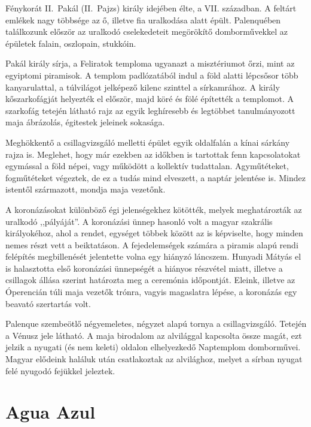 Fénykorát II.~Pakál (II.~Pajzs) király idejében élte, a VII. században.
A feltárt emlékek nagy többsége az ő, illetve fia uralkodása alatt
épült. Palenquében találkozunk először az uralkodó cselekedeteit
megörökítő domborművekkel az épületek falain, oszlopain, stukkóin.


Pakál király sírja, a Feliratok temploma ugyanazt a misztériumot
őrzi, mint az egyiptomi piramisok. A templom padlózatából indul a
föld alatti lépcsősor több kanyarulattal, a túlvilágot jelképező kilenc
szinttel a sírkamrához. A király kőszarkofágját helyezték el először,
majd köré és fölé építették a templomot. A szarkofág tetején látható
rajz az egyik leghíresebb és legtöbbet tanulmányozott maja ábrázolás,
égitestek jeleinek sokasága.

Meghökkentő a csillagvizsgáló melletti épület egyik oldalfalán
a kínai sárkány rajza is. Meglehet, hogy már ezekben az időkben is
tartottak fenn kapcsolatokat egymással a föld népei, vagy működött
a kollektív tudattalan. Agyműtéteket, fogműtéteket végeztek, de ez a
tudás mind elveszett, a naptár jelentése is. Mindez istentől származott,
mondja maja vezetőnk.


A koronázásokat különböző égi jelenségekhez kötötték, melyek
meghatározták az uralkodó ,,pályáját''. A koronázási ünnep hasonló
volt a magyar szakrális királyokéhoz, ahol a rendet, egységet többek
között az is képviselte, hogy minden nemes részt vett a beiktatáson.
A fejedelemségek számára a piramis alapú rendi felépítés megbillenését
jelentette volna egy hiányzó láncszem. Hunyadi Mátyás el is halasztotta
első koronázási ünnepségét a hiányos részvétel miatt, illetve
a csillagok állása szerint határozta meg a ceremónia időpontját. Eleink,
illetve az Óperencián túli maja vezetők trónra, vagyis magaslatra
lépése, a koronázás egy beavató szertartás volt.

Palenque szembeötlő négyemeletes, négyzet alapú tornya a csillagvizsgáló.
Tetején a Vénusz jele látható. A maja birodalom az alvilággal kapcsolta
össze magát, ezt jelzik a nyugati (és nem keleti) oldalon elhelyezkedő
Naptemplom domborművei. Magyar elődeink haláluk után csatlakoztak
az alvilághoz, melyet a sírban nyugat felé nyugodó fejükkel jeleztek.

\section{Agua Azul}

